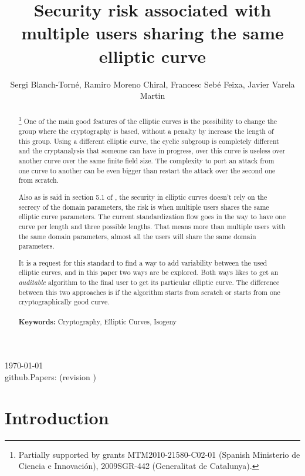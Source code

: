 \documentclass[10pt,a4paper,twoside]{llncs}
\title{Security risk associated with multiple users sharing the same elliptic curve}
\author{Sergi Blanch-Torn\'e\inst{1}, Ramiro Moreno Chiral\inst{2}, Francesc Seb\'e Feixa\inst{2}, Javier Varela Martin\inst{1}}
\institute{
 Escola Polit\`ecnica Superior, Universitat de Lleida. Spain.\\
 \email{\tt \{sblanch,jvarela\}@alumnes.udl.es}
 \and 
 Departament de Matem\`atica. Universitat de Lleida. Spain.\\
 \email{\tt \{ramiro,fsebe\}@matematica.udl.es}
 }
\newcommand{\version}{github.Papers: \gitCommitterDate\;(revision \gitAbbrevHash) }
\begin{document}
\maketitle
\begin{center}
 \today\\
 \version
\end{center}


\begin{abstract}\footnote{Partially supported by grants MTM2010-21580-C02-01 (Spanish Ministerio de Ciencia e Innovaci\'on), 2009SGR-442 (Generalitat de Catalunya).}
One of the main good features of the elliptic curves is the possibility to change the group where the cryptography is based, without a penalty by increase the length of this group. Using a different elliptic curve, the cyclic subgroup is completely different and the cryptanalysis that someone can have in progress, over this curve is useless over another curve over the same finite field size. The complexity to port an attack from one curve to another can be even bigger than restart the attack over the second one from scratch.

Also as is said in section 5.1 of \cite{X9.62-1998}, the security in elliptic curves doesn't rely on the secrecy of the domain parameters, the risk is when multiple users shares the same elliptic curve parameters. The current standardization \cite{rfc6637} flow goes in the way to have one curve per length and three possible lengths. That means more than multiple users with the same domain parameters, almost all the users will share the same domain parameters.

It is a request for this standard to find a way to add variability between the used elliptic curves, and in this paper two ways are be explored. Both ways likes to get an \emph{auditable} algorithm to the final user to get its particular elliptic curve. The difference between this two approaches is if the algorithm starts from scratch or starts from one cryptographically good curve.
\\\\    
{\bf Keywords:} Cryptography, Elliptic Curves, Isogeny
\end{abstract}

\section{Introduction \label{sec:intro}}
\end{document}
